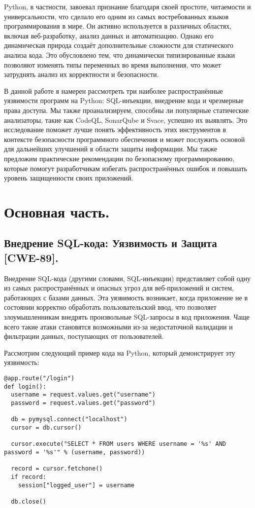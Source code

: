 \documentclass[a4paper,12pt]{article} %
\begin{document}
		\par Python, в частности, завоевал признание благодаря своей простоте, читаемости и универсальности, что сделало его одним из самых востребованных языков программирования в мире. Он активно используется в различных областях, включая веб-разработку, анализ данных и автоматизацию. Однако его динамическая природа создаёт дополнительные сложности для статического анализа кода. Это обусловлено тем, что динамически типизированные языки позволяют изменять типы переменных во время выполнения, что может затруднять анализ их корректности и безопасности.

		\par В данной работе я намерен рассмотреть три наиболее распространённые уязвимости программ на Python: SQL-инъекции, внедрение кода и чрезмерные права доступа. Мы также проанализируем, способны ли популярные статические анализаторы, такие как CodeQL, SonarQube и Svace, успешно их выявлять. Это исследование поможет лучше понять эффективность этих инструментов в контексте безопасности программного обеспечения и может послужить основой для дальнейших улучшений в области защиты информации. Мы также предложим практические рекомендации по безопасному программированию, которые помогут разработчикам избегать распространённых ошибок и повышать уровень защищенности своих приложений.

	\section{Основная часть.}
		\subsection{Внедрение SQL-кода: Уязвимость и Защита [CWE-89].}
			Внедрение SQL-кода (другими словами, SQL-инъекции) представляет собой одну из самых распространённых и опасных угроз для веб-приложений и систем, работающих с базами данных. Эта уязвимость возникает, когда приложение не в состоянии корректно обработать пользовательский ввод, что позволяет злоумышленникам внедрять произвольные SQL-запросы в код приложения. Чаще всего такие атаки становятся возможными из-за недостаточной валидации и фильтрации данных, поступающих от пользователей.

			\par Рассмотрим следующий пример кода на Python, который демонстрирует эту уязвимость:

			\begin{lstlisting}[style=pythonstyle]
@app.route("/login")
def login():
  username = request.values.get("username")
  password = request.values.get("password")

  db = pymysql.connect("localhost")
  cursor = db.cursor()

  cursor.execute("SELECT * FROM users WHERE username = '%s' AND password = '%s'" % (username, password))

  record = cursor.fetchone()
  if record:
    session["logged_user"] = username

  db.close()
			\end{lstlisting}
\end{document}
